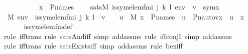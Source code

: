 \begin{isabellebody}
\ \ \ \ \ \ \ \ \ \ {\isachardoublequoteopen}x\ {\isasymin}\ P{\isacharunderscore}{\kern0pt}names{\isachardoublequoteclose}\ \isanewline
\ \ \ {\isachardoublequoteopen}sats{\isacharparenleft}{\kern0pt}M{\isacharcomma}{\kern0pt}\ is{\isacharunderscore}{\kern0pt}sym{\isacharunderscore}{\kern0pt}elem{\isacharunderscore}{\kern0pt}fm{\isacharparenleft}{\kern0pt}i{\isacharcomma}{\kern0pt}\ j{\isacharcomma}{\kern0pt}\ k{\isacharcomma}{\kern0pt}\ l{\isacharparenright}{\kern0pt}{\isacharcomma}{\kern0pt}\ env{\isacharparenright}{\kern0pt}\ {\isasymlongleftrightarrow}\ v\ {\isasymin}\ sym{\isacharparenleft}{\kern0pt}x{\isacharparenright}{\kern0pt}{\isachardoublequoteclose}\ \isanewline
%
\isadelimproof
%
\endisadelimproof
%
\isatagproof
{}\isamarkupfalse%
\ {\isacharminus}{\kern0pt}\ \isanewline
\ \ \isamarkupfalse%
\ {\isachardoublequoteopen}{\isacharparenleft}{\kern0pt}M{\isacharcomma}{\kern0pt}\ env\ {\isasymTurnstile}\ is{\isacharunderscore}{\kern0pt}sym{\isacharunderscore}{\kern0pt}elem{\isacharunderscore}{\kern0pt}fm{\isacharparenleft}{\kern0pt}i{\isacharcomma}{\kern0pt}\ j{\isacharcomma}{\kern0pt}\ k{\isacharcomma}{\kern0pt}\ l{\isacharparenright}{\kern0pt}{\isacharparenright}{\kern0pt}\ {\isasymlongleftrightarrow}\ {\isacharparenleft}{\kern0pt}v\ {\isasymin}\ {\isasymG}\ {\isasymand}\ {\isacharparenleft}{\kern0pt}{\isasymexists}u\ {\isasymin}\ M{\isachardot}{\kern0pt}\ {\isacharparenleft}{\kern0pt}x\ {\isasymin}\ P{\isacharunderscore}{\kern0pt}names\ {\isasymand}\ u\ {\isacharequal}{\kern0pt}\ Pn{\isacharunderscore}{\kern0pt}auto{\isacharparenleft}{\kern0pt}v{\isacharparenright}{\kern0pt}{\isacharbackquote}{\kern0pt}x{\isacharparenright}{\kern0pt}\ {\isasymand}\ u\ {\isacharequal}{\kern0pt}\ x{\isacharparenright}{\kern0pt}{\isacharparenright}{\kern0pt}{\isachardoublequoteclose}\ \isanewline
\ \ \ \ \isamarkupfalse%
\ is{\isacharunderscore}{\kern0pt}sym{\isacharunderscore}{\kern0pt}elem{\isacharunderscore}{\kern0pt}fm{\isacharunderscore}{\kern0pt}def\ \isanewline
\ \ \ \ \isamarkupfalse%
{\isacharparenleft}{\kern0pt}rule\ iff{\isacharunderscore}{\kern0pt}trans{\isacharcomma}{\kern0pt}\ rule\ sats{\isacharunderscore}{\kern0pt}And{\isacharunderscore}{\kern0pt}iff{\isacharcomma}{\kern0pt}\ simp\ add{\isacharcolon}{\kern0pt}assms{\isacharcomma}{\kern0pt}\ rule\ iff{\isacharunderscore}{\kern0pt}conjI{}{\isacharcomma}{\kern0pt}\ simp\ add{\isacharcolon}{\kern0pt}assms{\isacharparenright}{\kern0pt}\isanewline
\ \ \ \ \isamarkupfalse%
{\isacharparenleft}{\kern0pt}rule\ iff{\isacharunderscore}{\kern0pt}trans{\isacharcomma}{\kern0pt}\ rule\ sats{\isacharunderscore}{\kern0pt}Exists{\isacharunderscore}{\kern0pt}iff{\isacharcomma}{\kern0pt}\ simp\ add{\isacharcolon}{\kern0pt}assms{\isacharcomma}{\kern0pt}\ rule\ bex{\isacharunderscore}{\kern0pt}iff{\isacharparenright}{\kern0pt}\ \ \isanewline

\end{isabellebody}
